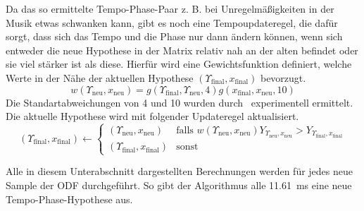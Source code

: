 {{{			%
			Da das so ermittelte Tempo-Phase-Paar  z. B. bei Unregelmä{\ss}igkeiten in der Musik etwas schwanken kann,
				gibt es noch eine Tempoupdateregel,
				die dafür sorgt,
				dass sich das Tempo und die Phase nur dann ändern können,
				wenn sich entweder die neue Hypothese in der Matrix relativ nah an der alten befindet
				oder sie viel stärker ist als diese.
			Hierfür wird eine Gewichtsfunktion definiert,
				welche Werte in der Nähe der aktuellen Hypothese $(\Upsilon_\text{final}, x_\text{final})$ bevorzugt.
			\begin{equation}
				w(\Upsilon_{\text{neu}}, x_{\text{neu}}) =
					g(\Upsilon_\text{final}, \Upsilon_{\text{neu}}, 4)
					g(x_\text{final}, x_{\text{neu}}, 10)
			\end{equation}
			Die Standartabweichungen von \num{4} und \num{10} wurden durch~\cite{2011_PlRoSt} experimentell ermittelt.
			Die aktuelle Hypothese wird mit folgender Updateregel aktualisiert.
			\begin{equation}
				(\Upsilon_\text{final}, x_\text{final}) \leftarrow
				\begin{cases}
					(\Upsilon_{\text{neu}}, x_{\text{neu}}) &
						\text{falls } w(\Upsilon_{\text{neu}}, x_{\text{neu}}) Y_{\Upsilon_{\text{neu}}, x_{\text{neu}}} >
							Y_{\Upsilon_\text{final}, x_\text{final}} \\
					(\Upsilon_\text{final}, x_\text{final}) &
						\text{sonst}
				\end{cases}
			\end{equation}

			Alle in diesem Unterabschnitt dargestellten Berechnungen werden für jedes neue Sample der \ac{ODF} durchgeführt.
			So gibt der Algorithmus alle \SI{11.61}{\milli\second} eine neue Tempo-Phase-Hypothese aus.
		}
	}
}
